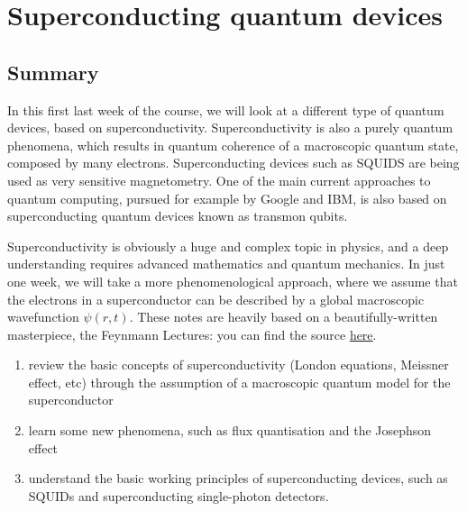 \documentclass[a4paper,11pt]{article}
\newenvironment{exercise}[1]
    {\begin{tcolorbox}[colback=yellow!10!white,
                     colframe=white!20!black,
                     title=#1,  
                     center, 
                     valign=top, 
                     halign=left,
                     before skip=0.8cm, 
                     after skip=1.2cm,
                     center title, 
                     width=12cm]
    }
    {
    \end{tcolorbox}
    }
\begin{document}
\sffamily


\section* {Superconducting quantum devices}

\renewcommand{\labelenumi}{\alph{enumi}.}


\subsection* {Summary}
In this first last week of the course, we will look at a different type of quantum devices, based on superconductivity. Superconductivity is also a purely quantum phenomena, which results in quantum coherence of a macroscopic quantum state, composed by many electrons. Superconducting devices such as SQUIDS are being used as very sensitive magnetometry. One of the main current approaches to quantum computing, pursued for example by Google and IBM, is also based on superconducting quantum devices known as transmon qubits.

Superconductivity is obviously a huge and complex topic in physics, and a deep understanding requires advanced mathematics and quantum mechanics. In just one week, we will take a more phenomenological approach, where we assume that the electrons in a superconductor can be described by a global macroscopic wavefunction $\psi (r, t)$. These notes are heavily based on a beautifully-written masterpiece, the Feynmann Lectures: you can find the source \href{https://www.feynmanlectures.caltech.edu/III_21.html#Ch21-SUM}{here}.


\begin{exercise}{Learning Objectives}
\begin{enumerate}
 \item review the basic concepts of superconductivity (London equations, Meissner effect, etc) through the assumption of a macroscopic quantum model for the superconductor
 \item learn some new phenomena, such as flux quantisation and the Josephson effect
 \item understand the basic working principles of superconducting devices, such as SQUIDs and superconducting single-photon detectors.
\end{enumerate}
\end{exercise}
\end{document}
